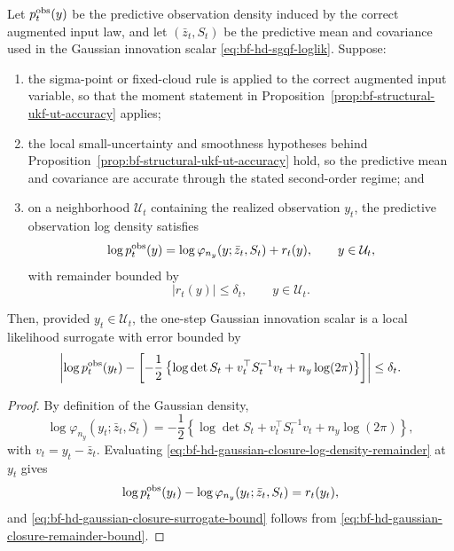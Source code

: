 \begin{proposition}
\label{prop:bf-hd-gaussian-closure-surrogate-regime}
Let \(p_t^{\rm obs}(y)\) be the predictive observation density induced by the
correct augmented input law, and let \((\bar z_t,S_t)\) be the predictive mean
and covariance used in the Gaussian innovation scalar
\eqref{eq:bf-hd-sgqf-loglik}.  Suppose:
\begin{enumerate}[label=(\roman*), leftmargin=0.28in]
  \item the sigma-point or fixed-cloud rule is applied to the correct augmented
    input variable, so that the moment statement in
    Proposition~\ref{prop:bf-structural-ukf-ut-accuracy} applies;
  \item the local small-uncertainty and smoothness hypotheses behind
    Proposition~\ref{prop:bf-structural-ukf-ut-accuracy} hold, so the predictive
    mean and covariance are accurate through the stated second-order regime; and
  \item on a neighborhood \(\mathcal U_t\) containing the realized observation
    \(y_t\), the predictive observation log density satisfies
    \begin{equation}
      \log p_t^{\rm obs}(y)
      =
      \log \varphi_{n_y}(y;\bar z_t,S_t)+r_t(y),
      \qquad y\in\mathcal U_t,
      \label{eq:bf-hd-gaussian-closure-log-density-remainder}
    \end{equation}
    with remainder bounded by
    \begin{equation}
      |r_t(y)|\le \delta_t,
      \qquad y\in\mathcal U_t.
      \label{eq:bf-hd-gaussian-closure-remainder-bound}
    \end{equation}
\end{enumerate}
Then, provided \(y_t\in\mathcal U_t\), the one-step Gaussian innovation scalar
is a local likelihood surrogate with error bounded by
\begin{equation}
  \left|
    \log p_t^{\rm obs}(y_t)
    -
    \left[-\frac12\left\{\log\det S_t+v_t^\top S_t^{-1}v_t+n_y\log(2\pi)\right\}\right]
  \right|
  \le \delta_t.
  \label{eq:bf-hd-gaussian-closure-surrogate-bound}
\end{equation}
\end{proposition}

\begin{proof}
By definition of the Gaussian density,
\[
  \log \varphi_{n_y}(y_t;\bar z_t,S_t)
  =
  -\frac12\left\{\log\det S_t+v_t^\top S_t^{-1}v_t+n_y\log(2\pi)\right\},
\]
with \(v_t=y_t-\bar z_t\).  Evaluating
\eqref{eq:bf-hd-gaussian-closure-log-density-remainder} at \(y_t\) gives
\[
  \log p_t^{\rm obs}(y_t)
  -
  \log \varphi_{n_y}(y_t;\bar z_t,S_t)
  =
  r_t(y_t),
\]
and \eqref{eq:bf-hd-gaussian-closure-surrogate-bound} follows from
\eqref{eq:bf-hd-gaussian-closure-remainder-bound}.
\end{proof}


